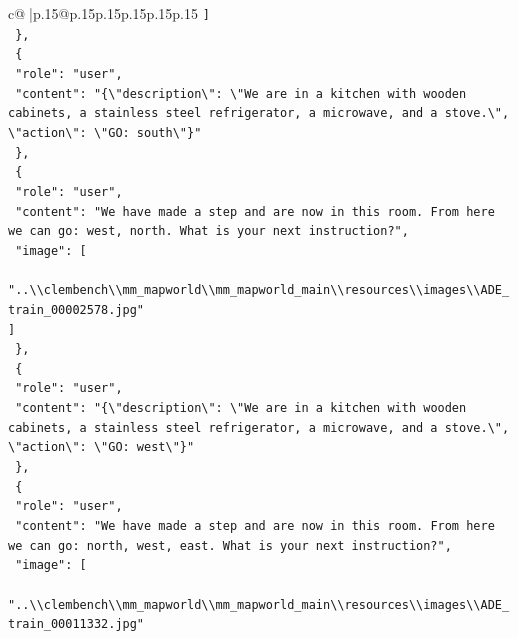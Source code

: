 \documentclass{article}
\begin{document}
{\begin{supertabular}{c@{$\;$}|p{.15\linewidth}@{}p{.15\linewidth}p{.15\linewidth}p{.15\linewidth}p{.15\linewidth}p{.15\linewidth}}
{{{\texttt{    {]}} \\
\texttt{  \},} \\
\texttt{  \{} \\
\texttt{    "role": "user",} \\
\texttt{    "content": "\{\textbackslash{}"description\textbackslash{}": \textbackslash{}"We are in a kitchen with wooden cabinets, a stainless steel refrigerator, a microwave, and a stove.\textbackslash{}", \textbackslash{}"action\textbackslash{}": \textbackslash{}"GO: south\textbackslash{}"\}"} \\
\texttt{  \},} \\
\texttt{  \{} \\
\texttt{    "role": "user",} \\
\texttt{    "content": "We have made a step and are now in this room. From here we can go: west, north. What is your next instruction?",} \\
\texttt{    "image": {[}} \\
\texttt{      "..\textbackslash{}\textbackslash{}clembench\textbackslash{}\textbackslash{}mm\_mapworld\textbackslash{}\textbackslash{}mm\_mapworld\_main\textbackslash{}\textbackslash{}resources\textbackslash{}\textbackslash{}images\textbackslash{}\textbackslash{}ADE\_train\_00002578.jpg"} \\
\texttt{    {]}} \\
\texttt{  \},} \\
\texttt{  \{} \\
\texttt{    "role": "user",} \\
\texttt{    "content": "\{\textbackslash{}"description\textbackslash{}": \textbackslash{}"We are in a kitchen with wooden cabinets, a stainless steel refrigerator, a microwave, and a stove.\textbackslash{}", \textbackslash{}"action\textbackslash{}": \textbackslash{}"GO: west\textbackslash{}"\}"} \\
\texttt{  \},} \\
\texttt{  \{} \\
\texttt{    "role": "user",} \\
\texttt{    "content": "We have made a step and are now in this room. From here we can go: north, west, east. What is your next instruction?",} \\
\texttt{    "image": {[}} \\
\texttt{      "..\textbackslash{}\textbackslash{}clembench\textbackslash{}\textbackslash{}mm\_mapworld\textbackslash{}\textbackslash{}mm\_mapworld\_main\textbackslash{}\textbackslash{}resources\textbackslash{}\textbackslash{}images\textbackslash{}\textbackslash{}ADE\_train\_00011332.jpg"} \\
}}}
\end{supertabular}}
\end{document}
